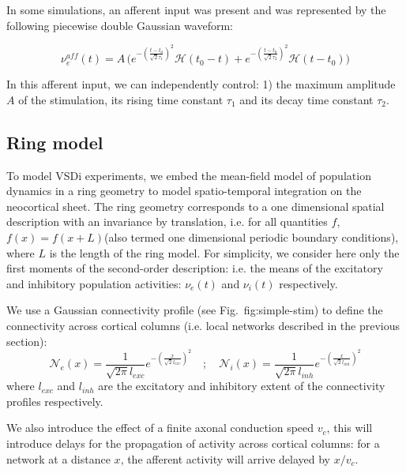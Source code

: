 \documentclass[8pt, colorlinks, a4paper]{article}
\renewcommand\ref{}
\newcommand{\corr}[1]{{#1}}
\begin{document}
In some simulations, an afferent input was present and was represented
by the following piecewise double Gaussian waveform:

\begin{equation}
\label{eq:input}
\nu_e^{aff}(t) = A \, \Big(
e^{-(\frac{t-t_0}{\sqrt{2} \tau_1})^2} \mathcal{H}(t_0-t)+
e^{-(\frac{t-t_0}{\sqrt{2} \tau_2})^2} \mathcal{H}(t-t_0)
\Big)
\end{equation}

In this afferent input, we can independently control: 1) the maximum
amplitude \(A\) of the stimulation, its rising time constant
\(\tau_1\) and its decay time constant \(\tau_2\).

\subsection{\corr{Ring model}}
\label{sec-3-7}

\corr{To model VSDi experiments, we embed the mean-field model of
  population dynamics in a ring geometry to model spatio-temporal
  integration on the neocortical sheet. The ring geometry corresponds
  to a one dimensional spatial description with an invariance by
  translation, i.e. for all quantities \(f\), \(f(x)=f(x+L)\)(also
  termed one dimensional periodic boundary conditions), where \(L\) is
  the length of the ring model. For simplicity, we consider here only
  the first moments of the second-order description: i.e. the means of
  the excitatory and inhibitory population activities: \(\nu_e(t)\)
  and \(\nu_i(t)\) respectively.}

\corr{We use a Gaussian connectivity profile (see
  Fig.~\ref{fig:simple-stim}) to define the connectivity across
  cortical columns (i.e. local networks described in the previous
  section):}
\begin{equation}
\mathcal{N}_e(x) = \frac{1}{\sqrt{2 \pi} l_{exc}} e^{-(\frac{x}{\sqrt{2} l_{exc}})^2} \quad ; \quad 
\mathcal{N}_i(x) = \frac{1}{\sqrt{2 \pi} l_{inh}} e^{-(\frac{x}{\sqrt{2} l_{inh}})^2}
\end{equation}
\corr{where \(l_{exc}\) and \(l_{inh}\) are the excitatory and inhibitory
extent of the connectivity profiles respectively.}

\corr{We also introduce the effect of a finite axonal conduction speed
  \(v_c\), this will introduce delays for the propagation of activity
  across cortical columns: for a network at a distance \(x\), the
  afferent activity will arrive delayed by \(x/v_c\).}
\end{document}
